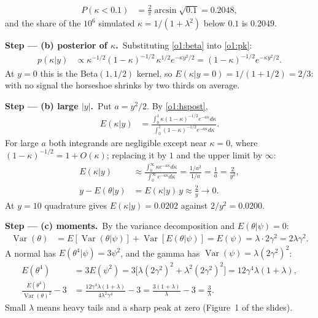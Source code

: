 \documentclass[11pt,a4paper]{article}
\newcommand{\passo}[2]{\par\smallskip\noindent\textbf{Step --- #1.}~#2}
\begin{document}
\begin{sol}
{\begin{align}
P(\kappa<0.1)&=\frac{2}{\pi}\arcsin\sqrt{0.1}=0.2048,\label{o1:p01}
\end{align}
and the share of the $10^6$ simulated $\kappa=1/(1+\lambda^2)$ below $0.1$ is $0.2049$.}
\passo{(b) posterior of $\kappa$}{Substituting \eqref{o1:beta} into \eqref{o1:pk}:
\begin{align}
p(\kappa|y)&\propto\kappa^{-1/2}(1-\kappa)^{-1/2}\,\kappa^{1/2}e^{-\kappa y^2/2}=(1-\kappa)^{-1/2}e^{-\kappa y^2/2}.\label{o1:hspost}
\end{align}
At $y=0$ this is the Beta$(1,1/2)$ kernel, so $E(\kappa|y=0)=1/(1+1/2)=2/3$: with no signal the horseshoe shrinks by two thirds on average.}
\passo{(b) large $|y|$}{Put $a=y^2/2$. By \eqref{o1:hspost},
\begin{align}
E(\kappa|y)&=\frac{\int_0^1\kappa(1-\kappa)^{-1/2}e^{-a\kappa}d\kappa}{\int_0^1(1-\kappa)^{-1/2}e^{-a\kappa}d\kappa}.\label{o1:ratio}
\end{align}
For large $a$ both integrands are negligible except near $\kappa=0$, where $(1-\kappa)^{-1/2}=1+O(\kappa)$; replacing it by $1$ and the upper limit by $\infty$:
\begin{align}
E(\kappa|y)&\approx\frac{\int_0^\infty\kappa e^{-a\kappa}d\kappa}{\int_0^\infty e^{-a\kappa}d\kappa}=\frac{1/a^2}{1/a}=\frac1a=\frac{2}{y^2},\label{o1:asym}\\
y-E(\theta|y)&=E(\kappa|y)\,y\approx\frac{2}{y}\to0.\label{o1:bias}
\end{align}
At $y=10$ quadrature gives $E(\kappa|y)=0.0202$ against $2/y^2=0.0200$.}
\passo{(c) moments}{By the variance decomposition and $E(\theta|\psi)=0$:
\begin{align}
\operatorname{Var}(\theta)&=E[\operatorname{Var}(\theta|\psi)]+\operatorname{Var}[E(\theta|\psi)]=E(\psi)=\lambda\cdot2\gamma^2=2\lambda\gamma^2.\label{o1:var}
\end{align}
A normal has $E(\theta^4|\psi)=3\psi^2$, and the gamma has $\operatorname{Var}(\psi)=\lambda(2\gamma^2)^2$:
\begin{align}
E(\theta^4)&=3E(\psi^2)=3\big[\lambda(2\gamma^2)^2+\lambda^2(2\gamma^2)^2\big]=12\gamma^4\lambda(1+\lambda),\label{o1:m4}\\
\frac{E(\theta^4)}{\operatorname{Var}(\theta)^2}-3&=\frac{12\gamma^4\lambda(1+\lambda)}{4\lambda^2\gamma^4}-3=\frac{3(1+\lambda)}{\lambda}-3=\frac3\lambda.\label{o1:kurt}
\end{align}
Small $\lambda$ means heavy tails and a sharp peak at zero (Figure~1 of the slides).}

\end{sol}
\end{document}
